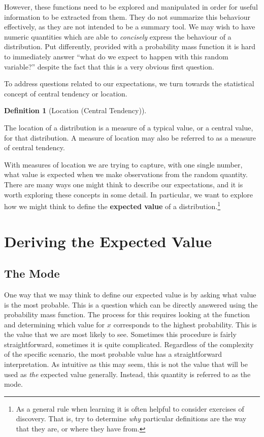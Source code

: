 \documentclass[
  letterpaper,
  DIV=11,
  numbers=noendperiod]{scrreprt}
\theoremstyle{definition}
\newtheorem{definition}{Definition}[chapter]
\theoremstyle{definition}
\theoremstyle{definition}
\theoremstyle{remark}
\begin{document}
However, these functions need to be explored and manipulated in order
for useful information to be extracted from them. They do not summarize
this behaviour effectively, as they are not intended to be a summary
tool. We may wish to have numeric quantities which are able to
\emph{concisely} express the behaviour of a distribution. Put
differently, provided with a probability mass function it is hard to
immediately answer ``what do we expect to happen with this random
variable?'' despite the fact that this is a very obvious first question.

To address questions related to our expectations, we turn towards the
statistical concept of central tendency or location.

\begin{definition}[Location (Central
Tendency)]\protect\hypertarget{def-location}{}\label{def-location}

The location of a distribution is a measure of a typical value, or a
central value, for that distribution. A measure of location may also be
referred to as a measure of central tendency.

\end{definition}

With measures of location we are trying to capture, with one single
number, what value is expected when we make observations from the random
quantity. There are many ways one might think to describe our
expectations, and it is worth exploring these concepts in some detail.
In particular, we want to explore how we might think to define the
\textbf{expected value} of a distribution.\footnote{As a general rule
  when learning it is often helpful to consider exercises of discovery.
  That is, try to determine \emph{why} particular definitions are the
  way that they are, or where they have from.}

\section{Deriving the Expected Value}\label{deriving-the-expected-value}

\subsection{The Mode}\label{the-mode}

One way that we may think to define our expected value is by asking what
value is the most probable. This is a question which can be directly
answered using the probability mass function. The process for this
requires looking at the function and determining which value for \(x\)
corresponds to the highest probability. This is the value that we are
most likely to see. Sometimes this procedure is fairly straightforward,
sometimes it is quite complicated. Regardless of the complexity of the
specific scenario, the most probable value has a straightforward
interpretation. As intuitive as this may seem, this is not the value
that will be used as \emph{the} expected value generally. Instead, this
quantity is referred to as the mode.
\end{document}
